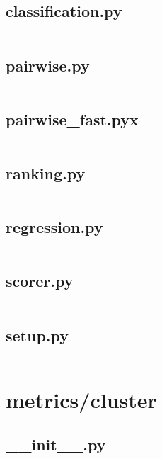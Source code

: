 \documentclass{article}
\begin{document}
\subsection{classification.py}
\inputminted{python}{/home/dufferzafar/dev/@clones/scikit-learn/sklearn/metrics/classification.py}
\newpage

\subsection{pairwise.py}
\inputminted{python}{/home/dufferzafar/dev/@clones/scikit-learn/sklearn/metrics/pairwise.py}
\newpage

\subsection{pairwise\_fast.pyx}
\inputminted{cython}{/home/dufferzafar/dev/@clones/scikit-learn/sklearn/metrics/pairwise_fast.pyx}
\newpage

\subsection{ranking.py}
\inputminted{python}{/home/dufferzafar/dev/@clones/scikit-learn/sklearn/metrics/ranking.py}
\newpage

\subsection{regression.py}
\inputminted{python}{/home/dufferzafar/dev/@clones/scikit-learn/sklearn/metrics/regression.py}
\newpage

\subsection{scorer.py}
\inputminted{python}{/home/dufferzafar/dev/@clones/scikit-learn/sklearn/metrics/scorer.py}
\newpage

\subsection{setup.py}
\inputminted{python}{/home/dufferzafar/dev/@clones/scikit-learn/sklearn/metrics/setup.py}
\newpage

\section{metrics/cluster}

\subsection{\_\_init\_\_.py}
\inputminted{python}{/home/dufferzafar/dev/@clones/scikit-learn/sklearn/metrics/cluster/__init__.py}
\newpage
\end{document}
